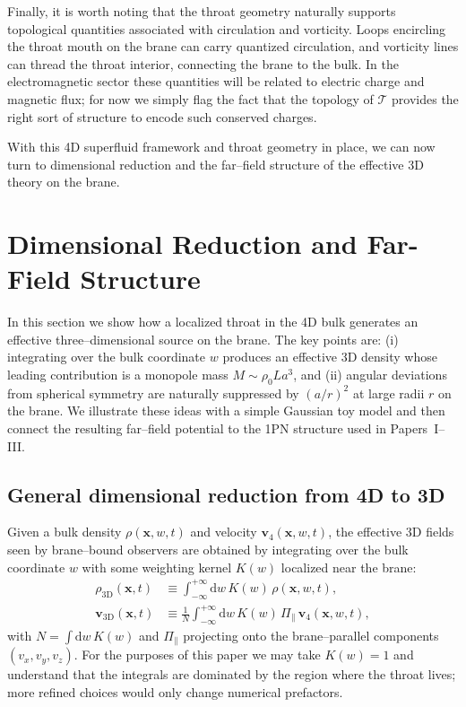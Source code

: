 \documentclass[12pt]{article}
\begin{document}
Finally, it is worth noting that the throat geometry naturally supports
topological quantities associated with circulation and vorticity.  Loops
encircling the throat mouth on the brane can carry quantized circulation,
and vorticity lines can thread the throat interior, connecting the brane to
the bulk.  In the electromagnetic sector these quantities will be related to
electric charge and magnetic flux; for now we simply flag the fact that the
topology of $\mathcal{T}$ provides the right sort of structure to encode
such conserved charges.

With this 4D superfluid framework and throat geometry in place, we can now
turn to dimensional reduction and the far--field structure of the effective
3D theory on the brane.

\section{Dimensional Reduction and Far-Field Structure}
\label{sec:dimensional_reduction}

In this section we show how a localized throat in the 4D bulk generates an
effective three--dimensional source on the brane.  The key points are:
(i) integrating over the bulk coordinate $w$ produces an effective 3D
density whose leading contribution is a monopole mass $M\sim \rho_0 L a^3$,
and (ii) angular deviations from spherical symmetry are naturally suppressed
by $(a/r)^2$ at large radii $r$ on the brane.  We illustrate these ideas
with a simple Gaussian toy model and then connect the resulting far--field
potential to the 1PN structure used in Papers~I--III.

\subsection{General dimensional reduction from 4D to 3D}
\label{subsec:dim_red_general}

Given a bulk density $\rho(\mathbf{x},w,t)$ and velocity
$\mathbf{v}_4(\mathbf{x},w,t)$, the effective 3D fields seen by brane--bound
observers are obtained by integrating over the bulk coordinate $w$ with some
weighting kernel $K(w)$ localized near the brane:
\begin{align}
  \rho_{\mathrm{3D}}(\mathbf{x},t)
  &\equiv \int_{-\infty}^{+\infty} \mathrm{d}w\,
    K(w)\,\rho(\mathbf{x},w,t),
    \label{eq:rho3d_general}
  \\
  \mathbf{v}_{\mathrm{3D}}(\mathbf{x},t)
  &\equiv
    \frac{1}{N}
    \int_{-\infty}^{+\infty} \mathrm{d}w\,
    K(w)\,\Pi_{\parallel}\,\mathbf{v}_4(\mathbf{x},w,t),
    \label{eq:v3d_general}
\end{align}
with $N = \int \mathrm{d}w\,K(w)$ and $\Pi_{\parallel}$ projecting onto the
brane--parallel components $(v_x,v_y,v_z)$.  For the purposes of this paper
we may take $K(w)=1$ and understand that the integrals are dominated by the
region where the throat lives; more refined choices would only change
numerical prefactors.
\end{document}
